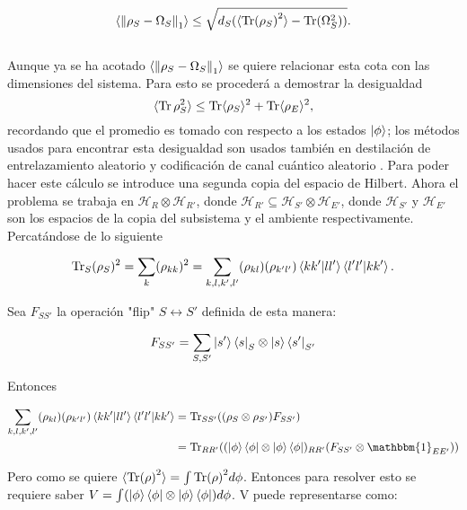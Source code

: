 \begin{equation}
\langle \norm{ \rho_{S}-\Omega_{S} }_{1}\rangle \le \sqrt{d_{S}( \langle \Tr(\rho_{S})^{2}\rangle -\Tr(\Omega_{S}^{2}) ) }.
\end{equation}
\\
Aunque ya se ha acotado $\langle \norm{ \rho_{S}-\Omega_{S} }_{1}\rangle$ se quiere relacionar esta cota con las dimensiones del sistema. Para esto se procederá a demostrar la desigualdad
\begin{equation}
\langle \Tr \rho_{S}^{2} \rangle \le \Tr \langle \rho_{S} \rangle^{2} +\Tr \langle \rho_E \rangle^{2},
\end{equation}
recordando que el promedio es tomado con respecto a los estados $\ket{\phi}$; los métodos usados para encontrar esta desigualdad son usados también en destilación de entrelazamiento aleatorio y codificación de canal cuántico aleatorio \cite{QuantumDistilation}. Para poder hacer este cálculo se introduce una segunda copia del espacio de Hilbert. Ahora el problema se trabaja en $\mathcal{H}_{R} \otimes \mathcal{H}_{R'}$, donde $\mathcal{H}_{R'} \subseteq \mathcal{H}_{S'} \otimes \mathcal{H}_{E'}$, donde $\mathcal{H}_{S'}$ y $\mathcal{H}_{E'}$ son los espacios de la copia del subsistema y el ambiente respectivamente. Percatándose de lo siguiente

\begin{equation}
\Tr_{S} (\rho_{S})^2 = \sum_{k} (\rho_{kk})^{2} = \sum_{k,l,k',l'}(\rho_{kl})(\rho_{k'l'}) \bra{kk'}\ket{ll'}\bra{l'l'}\ket{kk'}.
\end{equation}

Sea $F_{SS'}$ la operación "flip" $S \longleftrightarrow S'$ definida de esta manera:

\begin{equation}
F_{SS'} =\sum_{S,S'} \ket{s'}\bra{s}_{S} \otimes \ket{s}\bra{s'}_{S'}
\end{equation}

Entonces

\begin{align*} 
\sum_{k,l,k',l'}(\rho_{kl})(\rho_{k'l'}) \bra{kk'}\ket{ll'}\bra{l'l'}\ket{kk'} &= \Tr_{SS'} ((\rho_{S} \otimes \rho_{S'})F_{SS'})\\
\quad &=\Tr_{RR'}((\ket{\phi} \bra{\phi} \otimes \ket{\phi} \bra{\phi})_{RR'}(F_{SS'} \otimes \mathbbm{1}_{EE'}))
\end{align*}



Pero como se quiere $\langle \Tr (\rho)^{2} \rangle= \int \Tr (\rho)^{2} d\phi $. Entonces para resolver esto se requiere saber $V=\int (\ket{\phi} \bra{\phi} \otimes \ket{\phi} \bra{\phi})d\phi$. V puede representarse como:

